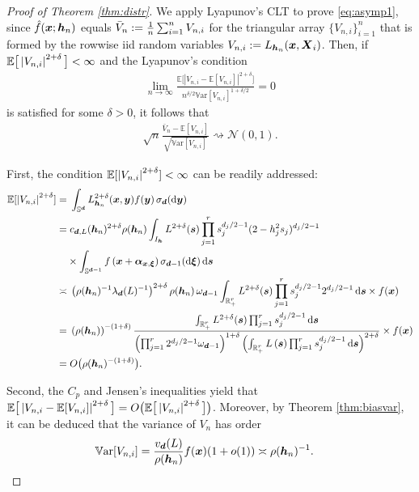 \documentclass[oneside,11pt]{article}
\begin{document}
\begin{proof}[Proof of Theorem \ref{thm:distr}]
We apply Lyapunov's CLT %
to prove \eqref{eq:asymp1}, since $\hat{f}(\boldsymbol{x};{\boldsymbol{h}}_n)$ equals $\bar{V}_n:=\frac{1}{n}\sum_{i=1}^nV_{n,i}$ for the triangular array $\{V_{n,i}\}_{i=1}^n$ that is formed by the rowwise iid random variables $V_{n,i}:= L_{{\boldsymbol{h}}_n}(\boldsymbol{x},\boldsymbol{X}_i)$. Then, if $\mathbb{E}\big[\left| V_{n,i}\right|^{2+\delta}\big]<\infty$ and the Lyapunov's condition
\begin{align*}
    \lim_{n\to\infty}\frac{\mathbb{E}\big[|V_{n,i}-\mathbb{E}[V_{n,i}]|^{2+\delta}\big]}{n^{\delta/2}\mathbb{V}\mathrm{ar}[V_{n,i}]^{1+\delta/2}}=0
\end{align*}
is satisfied for some $\delta>0$, it follows that
\begin{align*}
    \sqrt{n}\frac{\bar V_{n}-\mathbb{E}[V_{n,i}]}{\sqrt{\mathbb{V}\mathrm{ar}[V_{n,i}]}}\rightsquigarrow\mathcal{N}(0,1).
\end{align*}

First, the condition $\mathbb{E}[\left| V_{n,i}\right|^{2+\delta}]<\infty$ can be readily addressed:
\begin{align}
    \mathbb{E}[\left| V_{n,i}\right|^{2+\delta}]=&\;\int_{\mathbb{S}^{\boldsymbol{d}}}L^{2+\delta}_{{\boldsymbol{h}}_n}(\boldsymbol{x},\boldsymbol{y})f(\boldsymbol{y})\,\sigma_{\boldsymbol{d}}(\mathrm{d} \boldsymbol{y})\nonumber\\
    =&\;c_{\boldsymbol{d},L}({\boldsymbol{h}}_n)^{2+\delta}\rho({\boldsymbol{h}}_n)\int_{I_{\boldsymbol{h}}} L^{2+\delta}(\boldsymbol{s})\prod_{j=1}^rs_j^{d_j/2-1} (2-h_j^2s_j)^{d_j/2-1}\nonumber\\
        & \times \int_{\mathbb{S}^{\boldsymbol{d}-1}}f\left(\boldsymbol{x}+\boldsymbol\alpha_{\boldsymbol{x},\boldsymbol\xi}\right)\sigma_{\boldsymbol{d}-1}(\mathrm{d}\boldsymbol\xi)\,\mathrm{d} \boldsymbol{s}\nonumber\\
    \asymp&\;\left(\rho({\boldsymbol{h}}_n)^{-1}\lambda_{\boldsymbol{d}}(L)^{-1}\right)^{2+\delta}\rho({\boldsymbol{h}}_n)\,\omega_{\boldsymbol{d}-1}\int_{\mathbb{R}_+^r} L^{2+\delta}(\boldsymbol{s})\prod_{j=1}^rs_j^{d_j/2-1} 2^{d_j/2-1}\,\mathrm{d}\boldsymbol{s}\times f(\boldsymbol{x})  \nonumber\\
    =&\;\left(\rho({\boldsymbol{h}}_n)\right)^{-(1+\delta)}\frac{\int_{\mathbb{R}_+^r} L^{2+\delta}(\boldsymbol{s})\prod_{j=1}^rs_j^{d_j/2-1} \,\mathrm{d}\boldsymbol{s}}{\left(\prod_{j=1}^r 2^{d_j/2-1}\omega_{\boldsymbol{d}-1}\right)^{1+\delta}\left(\int_{\mathbb{R}_+^r}L\left(\boldsymbol{s}\right) \prod_{j=1}^r s_j^{d_j/2-1} \,\mathrm{d} \boldsymbol{s}\right)^{2+\delta}} \times f(\boldsymbol{x})\nonumber\\
    =&\;O\big(\rho({\boldsymbol{h}}_n)^{-(1+\delta)}\big).\label{eq:Vnd}
\end{align}

Second, the $C_p$ and Jensen's inequalities yield that $\mathbb{E}\big[\left| V_{n,i}-\mathbb{E}[V_{n,i}]\right|^{2+\delta}\big]=O\big(\mathbb{E}\big[\left| V_{n,i}\right|^{2+\delta}\big]\big)$. Moreover, by Theorem \ref{thm:biasvar}, it can be deduced that the variance of $V_n$ has order
\begin{align}
    \mathbb{V}\mathrm{ar}[V_{n,i}]=&\;\frac{v_{\boldsymbol{d}}(L)}{\rho({\boldsymbol{h}}_n)}f(\boldsymbol{x})(1+o(1))\asymp \rho({\boldsymbol{h}}_n)^{-1}.\label{eq:Vnvar}
\end{align}


\end{proof}
\end{document}

